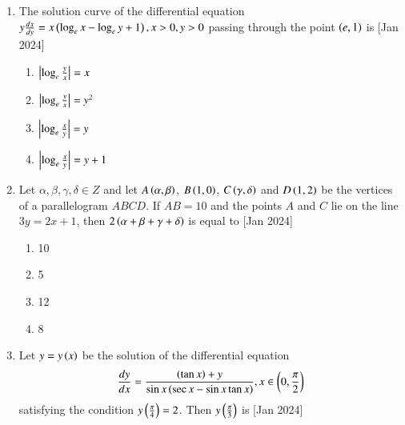 \documentclass[journal]{IEEEtran}
\begin{document}
\begin{enumerate}
    \begin{multicols}{4}
\begin{enumerate}

        \item 60
        \item 64
        \item 54
        \item 58
    \end{enumerate}
\end{multicols}

    \item The solution curve of the differential equation $y\frac{dx}{dy}
    = x\left(\log_e x - \log_e y + 1\right), x > 0, y > 0$ passing through the point
    $\left(e, 1\right)$ is
    \hfill{[Jan 2024]}

    \begin{multicols}{4}
\begin{enumerate}

        \item $\left\vert\log_e \frac{y}{x}\right\vert = x$
        \item $\left\vert\log_e \frac{y}{x}\right\vert = y^2$
        \item $\left\vert\log_e \frac{x}{y}\right\vert = y$
        \item $\left\vert\log_e \frac{x}{y}\right\vert = y + 1$
    \end{enumerate}
\end{multicols}

    \item Let $\alpha,\beta,\gamma,\delta \in Z$ and let $A\left(\alpha,\beta\right)$,
    $B\left(1, 0\right)$, $C\left(\gamma,\delta\right)$ and $D\left(1, 2\right)$ be the
    vertices of a parallelogram $ABCD$. If $AB = 10$ and the points
    $A$ and $C$ lie on the line $3y = 2x + 1$, then
    $2\left(\alpha + \beta + \gamma + \delta\right)$ is equal to
    \hfill{[Jan 2024]}

    \begin{multicols}{4}
\begin{enumerate}

        \item 10
        \item 5
        \item 12
        \item 8
    \end{enumerate}
\end{multicols}

    \item Let $y = y\left(x\right)$ be the solution of the differential equation
    \begin{align*}
    \frac{dy}{dx} = \frac{\left(\tan x\right) + y}{\sin x\left(\sec x - \sin x \tan x\right)},
    x \in \left(0, \frac{\pi}{2}\right)
    \end{align*}
    satisfying the condition $y\left(\frac{\pi}{4}\right) = 2$.
    Then $y\left(\frac{\pi}{3}\right)$ is
    \hfill{[Jan 2024]}


\end{enumerate}
\end{document}

